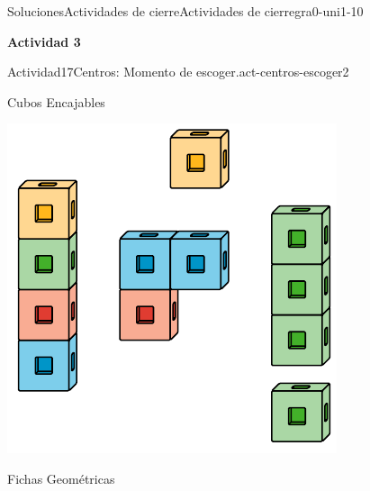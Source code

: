 \documentclass[twoside,10pt,]{article}
\begin{document}
\begin{solutions-section}{Soluciones}{Actividades de cierre}{}{Actividades de cierre}{}{}{gra0-uni1-10}
\par\medskip
\noindent\textbf{\large{}\space\textperiodcentered\space{}Actividad 3}
\begin{activitysolution}{Actividad}{17}{Centros: Momento de escoger.}{act-centros-escoger2}%
\begin{sidebyside}{2}{0.025}{0.025}{0.05}%
\begin{sbspanel}{0.45}%
Cubos Encajables%
\par
\includegraphics[width=\linewidth]{external/svg-source/tikz-file-128850.pdf}
\end{sbspanel}%
\begin{sbspanel}{0.45}%
Fichas Geométricas%
\par

\end{sbspanel}
\end{sidebyside}
\end{activitysolution}
\end{solutions-section}
\end{document}
